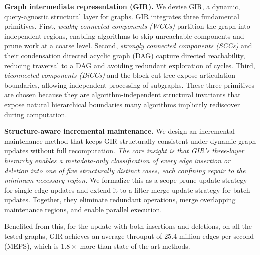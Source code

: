 \textbf{Graph intermediate representation (GIR).}
We devise GIR, a dynamic, query-agnostic structural layer for graphs. GIR integrates three fundamental primitives. First, \emph{weakly connected components (WCCs)} partition the graph into independent regions, enabling algorithms to skip unreachable components and prune work at a coarse level. Second, \emph{strongly connected components (SCCs)} and their condensation directed acyclic graph (DAG) capture directed reachability, reducing traversal to a DAG and avoiding redundant exploration of cycles. Third, \emph{biconnected components (BiCCs)} and the block-cut tree expose articulation boundaries, allowing independent processing of subgraphs. 
These three primitives are chosen because they are algorithm-independent structural invariants that expose natural hierarchical boundaries many algorithms implicitly rediscover during computation.

\textbf{Structure-aware incremental maintenance.} We design an incremental maintenance method that keeps GIR structurally consistent under dynamic graph updates without full recomputation. 
\textit{The core insight is that GIR's three-layer hierarchy enables a metadata-only classification of every edge insertion or deletion into one of five structurally distinct cases, each confining repair to the minimum necessary region.}
We formalize this as a scope-prune-update strategy for single-edge updates and extend it to a filter-merge-update strategy for batch updates. 
Together, they eliminate redundant operations, merge overlapping maintenance regions, and enable parallel execution.
\begin{maybecut}
Benefited from this, for the update with both insertions and deletions, on all the tested graphs, GIR achieves an average throuput of $25.4$ million edges per second (MEPS), which is $1.8\times$ more than state-of-the-art methods.
\end{maybecut}

